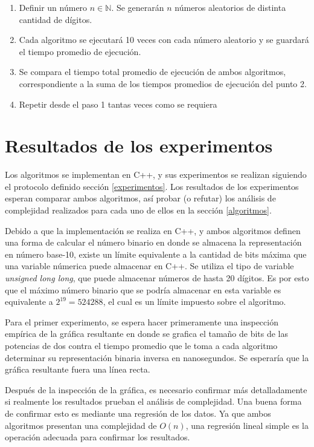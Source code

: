 \documentclass[letter]{article}
\begin{document}
\begin{enumerate}
    \item Definir un número $n \in\mathbb{N}$. Se generarán $n$ números aleatorios de distinta cantidad de dígitos.
    \item Cada algoritmo se ejecutará 10 veces con cada número aleatorio y se guardará el tiempo promedio de ejecución.
    \item Se compara el tiempo total promedio de ejecución de ambos algoritmos, correspondiente a la suma de los tiempos promedios de ejecución del punto 2.
    \item Repetir desde el paso 1 tantas veces como se requiera
\end{enumerate}

\section{Resultados de los experimentos}

Los algoritmos se implementan en C++, y sus experimentos se realizan siguiendo el protocolo definido sección \ref{experimentos}. Los resultados de los experimentos esperan comparar ambos algoritmos, así probar (o refutar) los análisis de complejidad realizados para cada uno de ellos en la sección \ref{algoritmos}. \par

Debido a que la implementación se realiza en C++, y ambos algoritmos definen una forma de calcular el número binario en donde se almacena la representación en número base-10, existe un límite equivalente a la cantidad de bits máxima que una variable númerica puede almacenar en C++. Se utiliza el tipo de variable \textit{unsigned long long}, que puede almacenar números de hasta 20 dígitos. Es por esto que el máximo número binario que se podría almacenar en esta variable es equivalente a $2^{19}=524288$, el cual es un límite impuesto sobre el algoritmo.

Para el primer experimento, se espera hacer primeramente una inspección empírica de la gráfica resultante en donde se grafica el tamaño de bits de las potencias de dos contra el tiempo promedio que le toma a cada algoritmo determinar su representación binaria inversa en nanosegundos. Se esperaría que la gráfica resultante fuera una línea recta. \par

Después de la inspección de la gráfica, es necesario confirmar más detalladamente si realmente los resultados prueban el análisis de complejidad. Una buena forma de confirmar esto es mediante una regresión de los datos. Ya que ambos algoritmos presentan una complejidad de $O(n)$, una regresión lineal simple es la operación adecuada para confirmar los resultados. \par
\end{document}
